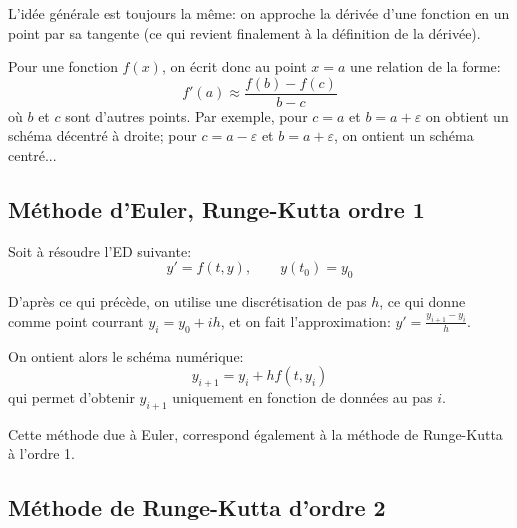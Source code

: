 \medskip
L'idée générale est toujours la même: on approche la dérivée d'une
fonction en un point par sa tangente (ce qui revient finalement à la définition 
de la dérivée).

Pour une fonction $f(x)$, on écrit donc au point $x=a$ une relation de la forme:
\begin{equation}
f'(a)\approx \frac{f(b)-f(c)}{b-c}
\end{equation}
où $b$ et $c$ sont d'autres points.
Par exemple, pour $c=a$ et $b=a+\varepsilon$ on obtient un schéma décentré
à droite; pour $c=a-\varepsilon$ et $b=a+\varepsilon$, on ontient un schéma
centré...


\medskip
\subsection{Méthode d'Euler, Runge-Kutta ordre 1}

Soit à résoudre l'ED suivante:
\begin{equation}
    y' = f(t, y), \qquad y(t_0) = y_0 
\end{equation}

\medskip
D'après ce qui précède, on utilise une discrétisation de pas $h$, ce qui
donne comme point courrant $y_i=y_0+ih$, et on fait l'approximation:
$y'=\frac{y_{i+1}-y_i}h$.

On ontient alors le schéma numérique:
\begin{equation}
y_{i+1}=y_i+hf(t,y_i)
\end{equation}
qui permet d'obtenir $y_{i+1}$ uniquement en fonction de données
au pas $i$.

\medskip
Cette méthode due à Euler, correspond également à la méthode
de Runge-Kutta à l'ordre 1.


\medskip
\subsection{Méthode de Runge-Kutta d'ordre 2}

